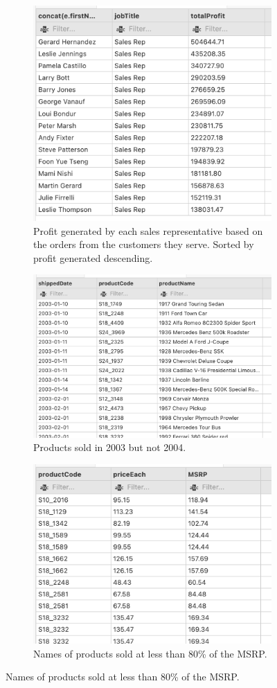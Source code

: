 \begin{figure}[htbp!]
    \begin{subfigure}{\textwidth}
        \centering
        \includegraphics[width=.5\linewidth]{images/output/q4.png}
        \caption*{Profit generated by each sales representative based on the orders from the customers they serve. Sorted by profit generated descending.}
        \label{fig:q4}
    \end{subfigure}
    \begin{subfigure}{.5\textwidth}
        \centering
        \includegraphics[width=.8\linewidth]{images/output/q5.png}
        \caption*{Products sold in 2003 but not 2004.}
        \label{fig:q5}
    \end{subfigure}
    \begin{subfigure}{.5\textwidth}
        \centering
        \includegraphics[width=.65\linewidth]{images/output/q7.png}
        \caption*{Names of products sold at less than 80\% of the MSRP.}
        \label{fig:q7}
    \end{subfigure}
\end{figure}
